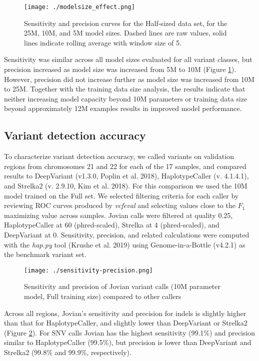 \documentclass[]{article}
\begin{document}
\begin{figure}[htp]
	\texttt{[image: ./modelsize\_effect.png]}
	\caption{ Sensitivity and precision curves for the Half-sized data set, for the 25M, 10M, and 5M model sizes. Dashed lines are raw values, solid lines indicate rolling average with window size of 5. }
	\label{fig:modelsize}
\end{figure}

Sensitivity was similar across all model sizes evaluated for all variant classes, but precision increased as model size was increased from 5M to 10M (Figure \ref{fig:modelsize}). However, precision did not increase further as model size was increased from 10M to 25M. Together with the training data size analysis, the results indicate that neither increasing model capacity beyond 10M parameters or training data size beyond approximately 12M examples results in improved model performance.


\subsection{Variant detection accuracy}

To characterize variant detection accuracy, we called variants on validation regions from chromosomes 21 and 22 for each of the 17 samples, and compared results to DeepVariant (v1.3.0, Poplin et al. 2018), HaplotypeCaller (v. 4.1.4.1), and Strelka2 (v. 2.9.10, Kim et al. 2018). For this comparison we used the 10M model trained on the Full set. We selected filtering criteria for each caller by reviewing ROC curves produced by \textit{vcfeval} and selecting values close to the $F_1$ maximizing value across samples. Jovian calls were filtered at quality 0.25, HaplotypeCaller at 60 (phred-scaled), Strelka at 4 (phred-scaled), and DeepVariant at 0. Sensitivity, precision, and related calculations were computed with the \textit{hap.py} tool (Krushe et al. 2019) using Genome-in-a-Bottle (v4.2.1) as the benchmark variant set. 

\begin{figure}[htp]
	\texttt{[image: ./sensitivity-precision.png]}
	\caption{ Sensitivity and precision of Jovian variant calls (10M parameter model, Full training size) compared to other callers }
	\label{fig:sens-ppv}
\end{figure}


Across all regions, Jovian's sensitivity and precision for indels is slightly higher than that for HaplotypeCaller, and slightly lower than DeepVariant or Strelka2 (Figure \ref{fig:sens-ppv}). For SNV calls Jovian has the highest sensitivity (99.1\%) and precision similar to HaplotypeCaller (99.5\%), but precision is lower than DeepVariant and Strelka2 (99.8\% and 99.9\%, respectively).
\end{document}
